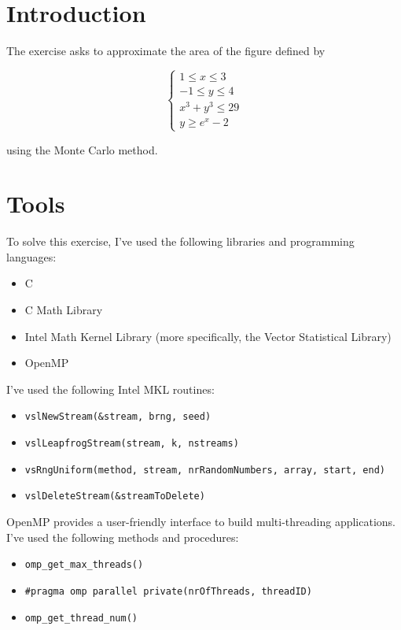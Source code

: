 \documentclass{article}
\newcommand{\code}{\texttt}
\begin{document}
\section{Introduction}\label{sec:intro}
The exercise asks to approximate the area of the figure defined by

$$
\begin{cases}
1 \le x \le 3 \\
-1\le y \le 4 \\  
x^3+y^3\le 29 \\
y \ge e^x -2
\end{cases}$$

using the Monte Carlo method.

\section{Tools}
To solve this exercise, I've used the following libraries and programming languages:

\begin{itemize}
  \item C
  \item C Math Library
  \item Intel Math Kernel Library (more specifically, the Vector Statistical Library)
  \item OpenMP
\end{itemize}

I've used the following Intel MKL routines:
\begin{itemize}
  \item \code{vslNewStream(\&stream, brng, seed)}
  \item \code{vslLeapfrogStream(stream, k, nstreams)}
  \item \code{vsRngUniform(method, stream, nrRandomNumbers, array, start, end)}
  \item \code{vslDeleteStream(\&streamToDelete)}
\end{itemize}

OpenMP provides a user-friendly interface to build multi-threading applications. I've used the following methods and procedures:
\begin{itemize}
  \item \code{omp\_get\_max\_threads()}
  \item \code{\#pragma omp parallel private(nrOfThreads, threadID)}
  \item \code{omp\_get\_thread\_num()}
\end{itemize}
\end{document}
